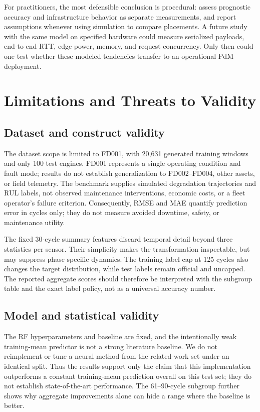 ﻿\documentclass[conference]{IEEEtran}
\begin{document}
For practitioners, the most defensible conclusion is procedural: assess prognostic accuracy and infrastructure behavior as separate measurements, and report assumptions whenever using simulation to compare placements. A future study with the same model on specified hardware could measure serialized payloads, end-to-end RTT, edge power, memory, and request concurrency. Only then could one test whether these modeled tendencies transfer to an operational PdM deployment.

\section{Limitations and Threats to Validity}
\subsection{Dataset and construct validity}
The dataset scope is limited to FD001, with 20,631 generated training windows and only 100 test engines. FD001 represents a single operating condition and fault mode; results do not establish generalization to FD002--FD004, other assets, or field telemetry. The benchmark supplies simulated degradation trajectories and RUL labels, not observed maintenance interventions, economic costs, or a fleet operator's failure criterion. Consequently, RMSE and MAE quantify prediction error in cycles only; they do not measure avoided downtime, safety, or maintenance utility.

The fixed 30-cycle summary features discard temporal detail beyond three statistics per sensor. Their simplicity makes the transformation inspectable, but may suppress phase-specific dynamics. The training-label cap at 125 cycles also changes the target distribution, while test labels remain official and uncapped. The reported aggregate scores should therefore be interpreted with the subgroup table and the exact label policy, not as a universal accuracy number.

\subsection{Model and statistical validity}
The RF hyperparameters and baseline are fixed, and the intentionally weak training-mean predictor is not a strong literature baseline. We do not reimplement or tune a neural method from the related-work set under an identical split. Thus the results support only the claim that this implementation outperforms a constant training-mean prediction overall on this test set; they do not establish state-of-the-art performance. The 61--90-cycle subgroup further shows why aggregate improvements alone can hide a range where the baseline is better.
\end{document}

